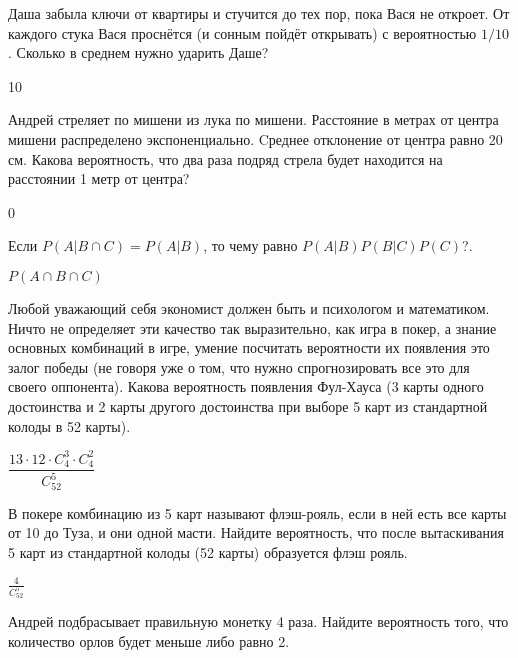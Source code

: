 \documentclass[12pt, addpoints, answers]{exam} %
\begin{document}
\begin{questions}

\question Даша забыла ключи от квартиры и стучится до тех пор, пока Вася не откроет. От каждого стука Вася проснётся (и сонным пойдёт открывать) с вероятностью $1/10$. Сколько в среднем нужно ударить Даше?

\begin{solution}
 10
\end{solution}

\question Андрей стреляет по мишени из лука по мишени. Расстояние в метрах от центра мишени распределено экспоненциально. Cреднее отклонение от центра равно 20 см. Какова вероятность, что два раза подряд стрела будет находится на расстоянии 1 метр от центра?

\begin{solution}
 0
\end{solution}

\question Если $P(A | B \cap C) = P(A | B)$, то чему равно $P(A|B)P(B|C)P(C)$?.


\begin{solution}
 $P(A \cap B \cap C)$
\end{solution}


\question Любой уважающий себя экономист должен быть и психологом и математиком. Ничто не определяет эти качество так выразительно, как игра в покер, а знание основных комбинаций в игре, умение посчитать вероятности их появления это залог победы (не говоря уже о том, что нужно спрогнозировать все это для своего оппонента). Какова вероятность появления Фул-Хауса (3 карты одного достоинства и 2 карты другого достоинства при выборе 5 карт из стандартной колоды в 52 карты).

\begin{solution}
 $\dfrac{13\cdot 12\cdot C_{4}^3 \cdot C_{4}^2}{ C_{52}^5}$
\end{solution}


\question В покере комбинацию из 5 карт называют флэш-рояль, если в ней есть все карты от 10 до Туза, и они одной масти.  Найдите вероятность, что после вытаскивания 5 карт из стандартной колоды (52 карты) образуется флэш рояль.

\begin{solution}
 $\frac{4}{C_{52}^5}$
\end{solution}

\question Андрей подбрасывает правильную монетку 4 раза. Найдите вероятность того, что количество орлов будет меньше либо равно 2.


\end{questions}
\end{document}
